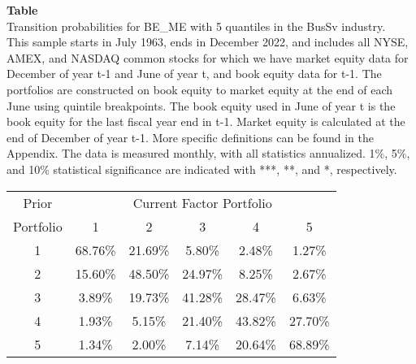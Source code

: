 \begin{table*}[ht!]
\raggedright
{}
\label{tab: transition_probs_BE_ME_BusSv_with_5_quantiles}
\textbf{Table \thetable} \\
Transition probabilities for BE_ME with 5 quantiles in the BusSv industry. \\
\hspace*{1em}This sample starts in July 1963, ends in December 2022, and includes all NYSE, AMEX, and NASDAQ common stocks for which we have market equity data for December of year t-1 and June of year t, and book equity data for t-1. The portfolios are constructed on book equity to market equity at the end of each June using quintile breakpoints.  The book equity used in June of year t is the book equity for the last fiscal year end in t-1.  Market equity is calculated at the end of December of year t-1.  More specific definitions can be found in the Appendix.  The data is measured monthly, with all statistics annualized.  1\%, 5\%, and 10\% statistical significance are indicated with ***, **, and *, respectively. \\
\vspace{0.5em}
\centering
\begin{adjustbox}{max width=\textwidth}
\begin{tabular}{@{}cccccc@{}}
\toprule
Prior & \multicolumn{5}{c}{Current Factor Portfolio} \\
Portfolio & 1 & 2 & 3 & 4 & 5 \\
\midrule
1 & 68.76\% & 21.69\% & 5.80\% & 2.48\% & 1.27\% \\
2 & 15.60\% & 48.50\% & 24.97\% & 8.25\% & 2.67\% \\
3 & 3.89\% & 19.73\% & 41.28\% & 28.47\% & 6.63\% \\
4 & 1.93\% & 5.15\% & 21.40\% & 43.82\% & 27.70\% \\
5 & 1.34\% & 2.00\% & 7.14\% & 20.64\% & 68.89\% \\
\bottomrule
\end{tabular}
\end{adjustbox}
\end{table*}